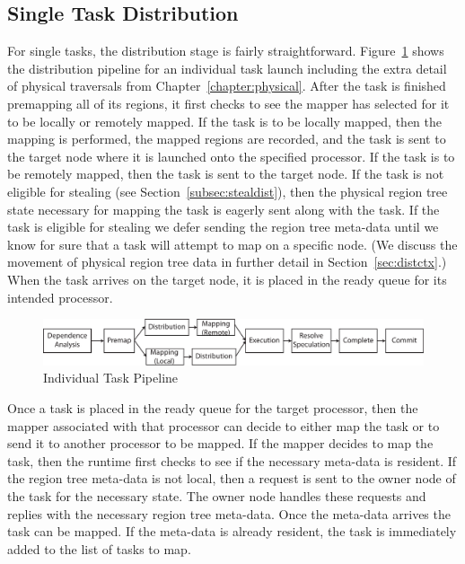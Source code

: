 \subsection{Single Task Distribution}
\label{subsec:singledist}
For single tasks, the distribution stage is fairly
straightforward.  Figure~\ref{fig:singletaskdist}
shows the distribution pipeline for an individual task
launch including the extra detail of physical traversals
from Chapter~\ref{chapter:physical}. After the task 
is finished premapping all of its regions, it first 
checks to see the mapper has selected for it to be 
locally or remotely mapped.  If the task is to be 
locally mapped, then the mapping is performed, the 
mapped regions are recorded, and the task is sent
to the target node where it is launched onto the
specified processor. If the task is to be remotely
mapped, then the task is sent to the
target node. If the task is not eligible for stealing
(see Section~\ref{subsec:stealdist}), then the 
physical region tree state necessary for mapping
the task is eagerly sent along with the task. If 
the task is eligible for stealing we defer sending
the region tree meta-data until we know for sure that
a task will attempt to map on a specific node.
(We discuss the movement of physical region tree
data in further detail in Section~\ref{sec:distctx}.)
When the task arrives on the target node, it is
placed in the ready queue for its intended processor.

\begin{figure}
\centering
\includegraphics[scale=0.7]{figs/IndividualTaskPipeline.pdf}
\caption{Individual Task Pipeline\label{fig:singletaskdist}}
\end{figure}

Once a task is placed in the ready queue for the
target processor, then the mapper associated with
that processor can decide to either map the task
or to send it to another processor to be mapped.
If the mapper decides to map the task, then the runtime
first checks to see if the necessary meta-data
is resident.  If the region tree meta-data is not
local, then a request is sent to the owner node of
the task for the necessary state. The owner node
handles these requests and replies with the necessary
region tree meta-data. Once the meta-data arrives
the task can be mapped. If the meta-data is already
resident, the task is immediately added to the list
of tasks to map.

